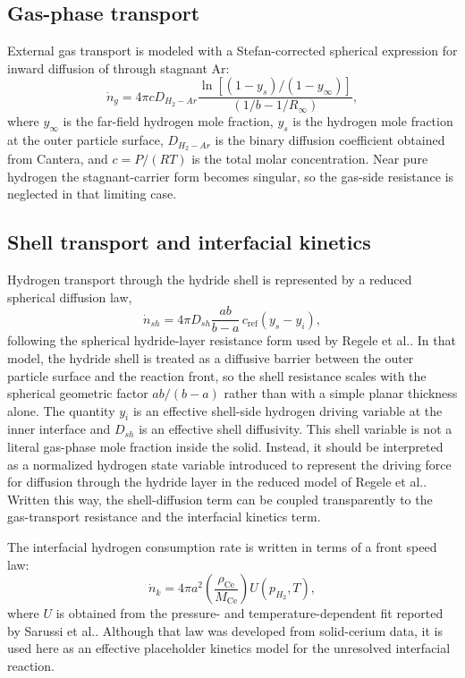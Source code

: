 \documentclass[11pt]{article}
\begin{document}
\subsection{Gas-phase transport}

External gas transport is modeled with a Stefan-corrected spherical expression
for inward diffusion of  through stagnant Ar:
\begin{equation}
\dot{n}_{g} =
4 \pi c D_{H_2-Ar}
\frac{\ln\!\left[\left(1-y_s\right)/\left(1-y_{\infty}\right)\right]}
{\left(1/b - 1/R_{\infty}\right)} ,
\end{equation}
where $y_{\infty}$ is the far-field hydrogen mole fraction, $y_s$ is the
hydrogen mole fraction at the outer particle surface, $D_{H_2-Ar}$ is the
binary diffusion coefficient obtained from Cantera, and $c=P/(RT)$ is the total
molar concentration. Near pure hydrogen the stagnant-carrier form becomes
singular, so the gas-side resistance is neglected in that limiting case.

\subsection{Shell transport and interfacial kinetics}

Hydrogen transport through the hydride shell is represented by a reduced
spherical diffusion law,
\begin{equation}
\dot{n}_{sh} =
4 \pi D_{sh}\frac{ab}{b-a}\,c_{\mathrm{ref}}\left(y_s-y_i\right),
\end{equation}
following the spherical hydride-layer resistance form used by Regele
et al.\cite{Regele2023}. In that model, the hydride shell is treated as a
diffusive barrier between the outer particle surface and the reaction front, so
the shell resistance scales with the spherical geometric factor $ab/(b-a)$
rather than with a simple planar thickness alone. The quantity $y_i$ is an
effective shell-side hydrogen driving variable at the inner interface and
$D_{sh}$ is an effective shell diffusivity. This shell variable is not a
literal gas-phase mole fraction inside the solid. Instead, it should be
interpreted as a normalized hydrogen state variable introduced to represent the
driving force for diffusion through the hydride layer in the reduced model of
Regele et al.\cite{Regele2023}. Written this way, the shell-diffusion term can
be coupled transparently to the gas-transport resistance and the interfacial
kinetics term.

The interfacial hydrogen consumption rate is written in terms of a front speed law:
\begin{equation}
\dot{n}_{k} =
4 \pi a^2 \left(\frac{\rho_{\mathrm{Ce}}}{M_{\mathrm{Ce}}}\right)
U(p_{H_2},T),
\end{equation}
where $U$ is obtained from the pressure- and temperature-dependent fit reported
by Sarussi et al.\cite{Sarussi1993}. Although that law was developed from
solid-cerium data, it is used here as an effective placeholder kinetics model
for the unresolved interfacial reaction.
\end{document}
